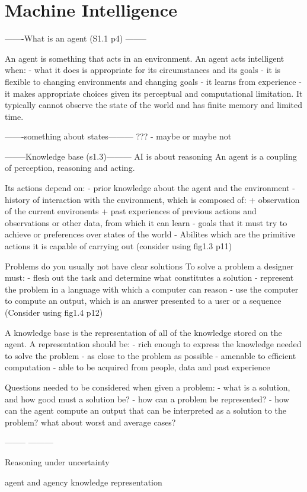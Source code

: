\section{Machine Intelligence}
 
-------What is an agent (S1.1 p4) --------

An agent is something that acts in an environment.
An agent acts intelligent when:
- what it does is appropriate for its circumstances and its goals
- it is flexible to changing environments and changing goals
- it learns from experience
- it makes appropriate choices given its perceptual and computational
limitation. It typically cannot observe the state of the world and has finite
memory and limited time.

-------something about states---------
??? - maybe or maybe not

--------Knowledge base (s1.3)---------
AI is about reasoning
An agent is a coupling of perception, reasoning and acting.

Its actions depend on:
- prior knowledge about the agent and the environment
- history of interaction with the environment, which is composed of:
+ observation of the current environents
+ past experiences of previous actions and observations or other data, from
which it can learn
- goals that it must try to achieve or preferences over states of the world
- Abilites which are the primitive actions it is capable of carrying out
(consider using fig1.3 p11)

Problems do you usually not have clear solutions
To solve a problem a designer must:
- flesh out the task and determine what constitutes a solution
- represent the problem in a language with which a computer can reason
- use the computer to compute an output, which is an answer presented to a user
or a sequence
(Consider using fig1.4 p12)

A knowledge base is the representation of all of the knowledge stored on the
agent. A representation should be:
- rich enough to express the knowledge needed to solve the problem
- as close to the problem as possible
- amenable to efficient computation
- able to be acquired from people, data and past experience

Questions needed to be considered when given a problem:
- what is a solution, and how good must a solution be?
- how can a problem be represented?
- how can the agent compute an output that can be interpreted as a solution to
the problem? what about worst and average cases?


 -------- ---------

Reasoning under uncertainty

agent and agency
knowledge representation
